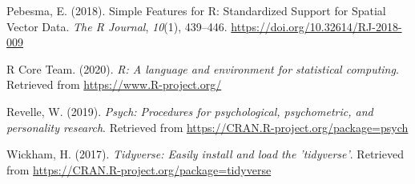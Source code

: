 \documentclass[11pt,]{article}
\begin{document}
\hypertarget{ref-sfpackage}{}
Pebesma, E. (2018). Simple Features for R: Standardized Support for
Spatial Vector Data. \emph{The R Journal}, \emph{10}(1), 439--446.
\url{https://doi.org/10.32614/RJ-2018-009}

\hypertarget{ref-RSoft}{}
R Core Team. (2020). \emph{R: A language and environment for statistical
computing}. Retrieved from \url{https://www.R-project.org/}

\hypertarget{ref-psych}{}
Revelle, W. (2019). \emph{Psych: Procedures for psychological,
psychometric, and personality research}. Retrieved from
\url{https://CRAN.R-project.org/package=psych}

\hypertarget{ref-Tidyverse}{}
Wickham, H. (2017). \emph{Tidyverse: Easily install and load the
'tidyverse'}. Retrieved from
\url{https://CRAN.R-project.org/package=tidyverse}




\newpage
\singlespacing 
\end{document}
